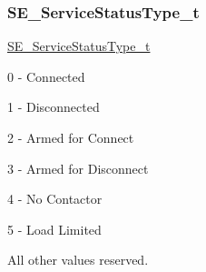 \subsubsection{\texorpdfstring{S\+E\+\_\+\+Service\+Status\+Type\+\_\+t}{SE\_ServiceStatusType\_t}}
{\footnotesize\ttfamily \hyperlink{group__ServiceStatusType_gaa3cd725afc87388d65acf81254caee7d}{S\+E\+\_\+\+Service\+Status\+Type\+\_\+t}}

0 -\/ Connected

1 -\/ Disconnected

2 -\/ Armed for Connect

3 -\/ Armed for Disconnect

4 -\/ No Contactor

5 -\/ Load Limited

All other values reserved. 